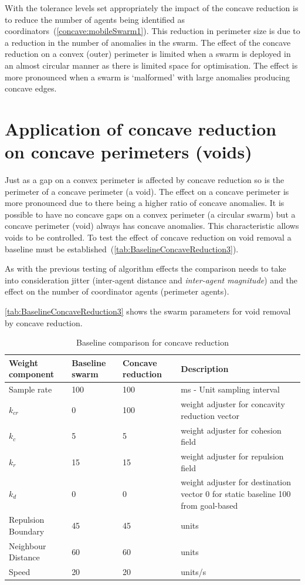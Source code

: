 With the tolerance levels set appropriately the impact of the concave reduction is to reduce the number of agents being identified as coordinators~(\autoref{concave:mobileSwarm1}). This reduction in perimeter size is due to a reduction in the number of anomalies in the swarm. The effect of the concave reduction on a convex (outer) perimeter is limited when a swarm is deployed in an almost circular manner as there is limited space for optimisation. The effect is more pronounced when a swarm is `malformed' with large anomalies producing concave edges.

\section{Application of concave reduction on concave perimeters (voids)}\label{sec:ApplicationConcavePerimeters}
Just as a gap on a convex perimeter is affected by concave reduction so is the perimeter of a concave perimeter (a void). The effect on a concave perimeter is more pronounced due to there being a higher ratio of concave anomalies. It is possible to have no concave gaps on a convex perimeter (a circular swarm) but a concave perimeter (void) always has concave anomalies. This characteristic allows voids to be controlled. To test the effect of concave reduction on void removal a baseline must be established~(\autoref{tab:BaselineConcaveReduction3}).

As with the previous testing of algorithm effects the comparison needs to take into consideration jitter (inter-agent distance and \textit{inter-agent magnitude}) and the effect on the number of coordinator agents (perimeter agents). 

\autoref{tab:BaselineConcaveReduction3} shows the swarm parameters for void removal by concave reduction.

\begin{table}[H]
\begin{center}
\begin{tabular}{| p{2.3cm} | p{2cm} | p{2cm} | p{5cm} |}
\hline
\bf Weight \bf component & \bf Baseline \bf swarm & \bf Concave \bf reduction & \bf Description \\ \hline
Sample rate & 100 & 100 & ms - Unit sampling interval\\  \hline
$k_{cr}$ & 0 & 100 & weight adjuster for concavity reduction vector\\  \hline
$k_c$ & 5 & 5 & weight adjuster for cohesion field\\  \hline
$k_r$ & 15 & 15 & weight adjuster for repulsion field\\  \hline
$k_d$ & 0 & 0 & weight adjuster for destination vector 0 for static baseline 100 from goal-based\\  \hline
Repulsion Boundary & 45 & 45 & units\\  \hline
Neighbour Distance & 60 & 60 & units\\  \hline
Speed & 20 & 20 & units/s\\  \hline
\end{tabular}\caption{Baseline comparison for concave reduction} \label{tab:BaselineConcaveReduction3}
\end{center}
\end{table}

